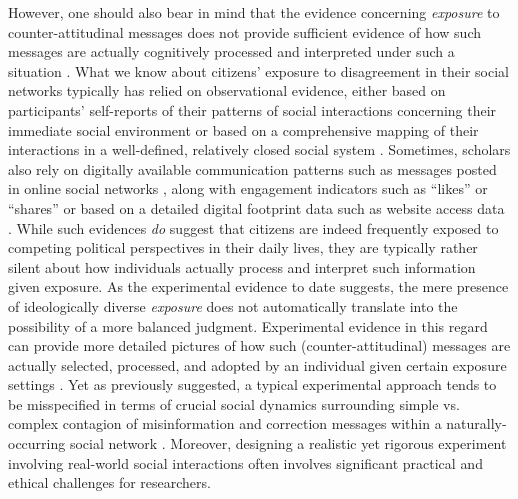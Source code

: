 \documentclass[man, 12pt, a4paper, nolmodern, noextraspace]{apa6}
\begin{document}
    However, one should also bear in mind that the evidence concerning \emph{exposure} to counter-attitudinal messages does not provide sufficient evidence of how such messages are actually cognitively processed and interpreted under such a situation \parencites[e.g., see ``engagement echo chamber'' discussion in][]{Garrett2017distraction}[also see][]{nyhan2017taking}. What we know about citizens' exposure to disagreement in their social networks typically has relied on observational evidence, either based on participants' self-reports of their patterns of social interactions concerning their immediate social environment \parencite{huckfeldt2004disagreement} or based on a comprehensive mapping of their interactions in a well-defined, relatively closed social system \parencite[e.g.,][]{song2015uncovering, lazer2010coevolution}. Sometimes, scholars also rely on digitally available communication patterns such as messages posted in online social networks \parencite[e.g.,][]{margolin2017}, along with engagement indicators such as \enquote{likes} or \enquote{shares} \parencite[e.g.,][]{Bakshy1130} or based on a detailed digital footprint data such as website access data \parencite[e.g.,][]{guess2018selective}. While such evidences \emph{do} suggest that citizens are indeed frequently exposed to competing political perspectives in their daily lives, they are typically rather silent about how individuals actually process and interpret such information given exposure. As the experimental evidence to date suggests, the mere presence of ideologically diverse \emph{exposure} does not automatically translate into the possibility of a more balanced judgment. Experimental evidence in this regard can provide more detailed pictures of how such (counter-attitudinal) messages are actually selected, processed, and adopted by an individual given certain exposure settings \parencite[e.g., ][]{messing2014selective, nyhan2017taking, Wood2018}. Yet as previously suggested, a typical experimental approach tends to be misspecified in terms of crucial social dynamics surrounding simple vs. complex contagion of misinformation and correction messages within a naturally-occurring social network \parencite{margolin2017, Centola2010Sience}. Moreover, designing a realistic yet rigorous experiment involving real-world social interactions often involves significant practical \parencite[e.g.,][]{bond_61million} and ethical challenges \parencite[e.g.,][]{Kramer8788} for researchers.       
    
\end{document}
